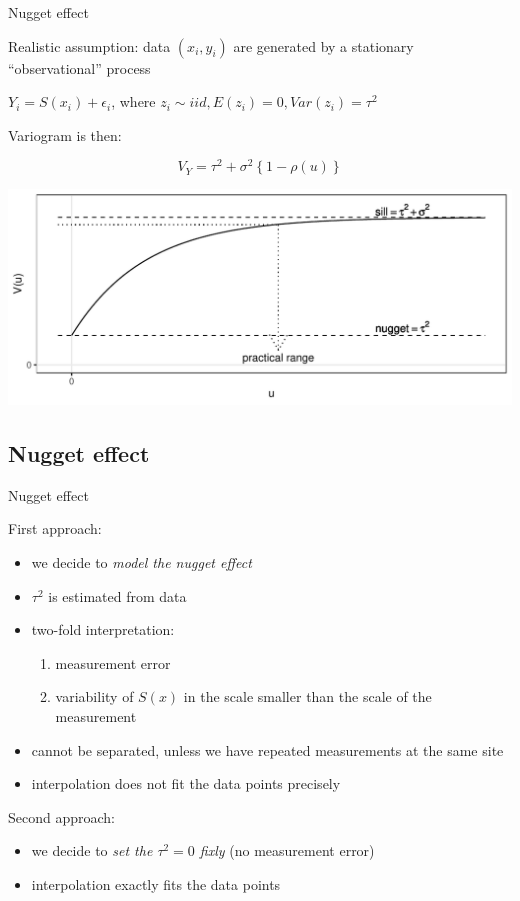 \documentclass[
  ignorenonframetext,
]{beamer}
\providecommand{\tightlist}{%
  \setlength{\itemsep}{0pt}\setlength{\parskip}{0pt}}
\begin{document}
\begin{frame}{Nugget effect}
\small

Realistic assumption: data \((x_i,y_i)\) are generated by a stationary
``observational'' process

\(Y_i=S(x_i)+\epsilon_i\), where
\(z_i\sim iid, E(z_i)=0, Var(z_i)=\tau^2\)

Variogram is then:

\[V_Y=\tau^2+\sigma^2\left\{1-\rho(u)\right\}\]

\includegraphics{Lecture_1_files/figure-beamer/unnamed-chunk-51-1.pdf}
\end{frame}

\hypertarget{nugget-effect-1}{%
\subsection{Nugget effect}\label{nugget-effect-1}}

\begin{frame}{Nugget effect}
\small

First approach:

\begin{itemize}
\tightlist
\item
  we decide to \emph{model the nugget effect}
\item
  \(\tau^2\) is estimated from data
\item
  two-fold interpretation:

  \begin{enumerate}
  \tightlist
  \item
    measurement error
  \item
    variability of \(S(x)\) in the scale smaller than the scale of the
    measurement
  \end{enumerate}
\item
  cannot be separated, unless we have repeated measurements at the same
  site
\item
  interpolation does not fit the data points precisely
\end{itemize}

Second approach:

\begin{itemize}
\tightlist
\item
  we decide to \emph{set the \(\tau^2=0\) fixly} (no measurement error)
\item
  interpolation exactly fits the data points
\end{itemize}
\end{frame}
\end{document}
